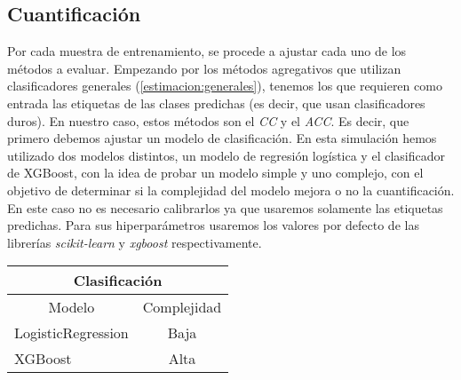 \subsection{Cuantificación}\label{experimentos:cuantificacion}

Por cada muestra de entrenamiento, se procede a ajustar cada uno de los métodos
a evaluar. Empezando por los métodos agregativos que utilizan clasificadores
generales (\ref{estimacion:generales}), tenemos los que requieren como entrada
las etiquetas de las clases predichas (es decir, que usan clasificadores duros).
En nuestro caso, estos métodos son el {\it CC\/} y el {\it ACC}. Es decir, que
primero debemos ajustar un modelo de clasificación. En esta simulación hemos
utilizado dos modelos distintos, un modelo de regresión logística y el
clasificador de XGBoost, con la idea de probar un modelo simple y uno complejo,
con el objetivo de determinar si la complejidad del modelo mejora o no la
cuantificación. En este caso no es necesario calibrarlos ya que usaremos
solamente las etiquetas predichas. Para sus hiperparámetros usaremos los valores
por defecto de las librerías {\it scikit-learn\/} y {\it xgboost\/}
respectivamente.
\begin{center}
    \begin{tabular}{|lc|}
        \hline
        \multicolumn{2}{|c|}{Clasificación}                     \\ \hline
        \multicolumn{1}{|c|}{Modelo}             & Complejidad  \\ \hline
        \multicolumn{1}{|l|}{LogisticRegression} & Baja         \\
        \multicolumn{1}{|l|}{XGBoost}            & Alta         \\ \hline
    \end{tabular}
\label{experimentos:tabla_clasificacion}
\end{center}

